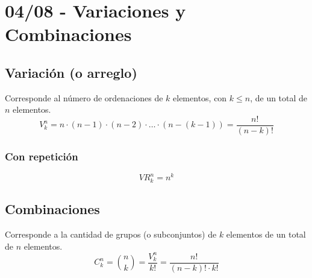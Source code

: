 \documentclass[12pt, letterpaper]{article}
\begin{document}
\section{04/08 - Variaciones y Combinaciones}
\subsection{Variación (o arreglo)}
Corresponde al número de ordenaciones de $k$ elementos, con $k \leq n$, de un total de $n$ elementos.
\[V_k^n = n \cdot (n - 1) \cdot (n - 2) \cdot \dots \cdot (n - (k - 1)) = \frac{n!}{(n - k)!} \]
\subsubsection*{Con repetición}
\[VR_k^n = n^k \]

\subsection{Combinaciones} Corresponde a la cantidad de grupos (o subconjuntos) de $k$ elementos de un total de $n$ elementos.
\[C_k^n = \binom{n}{k} = \frac{V_k^n}{k!} = \frac{n!}{(n - k)! \cdot k!} \]
\end{document}
